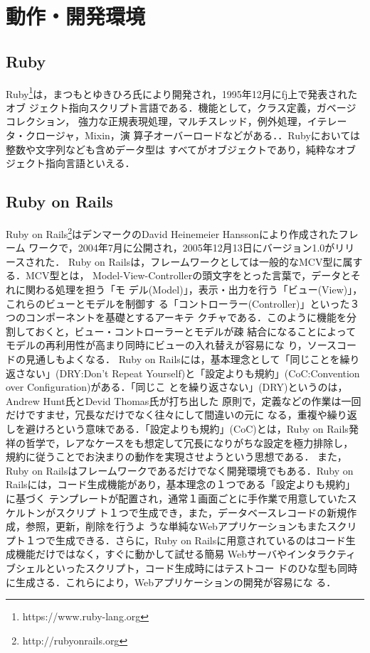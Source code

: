 \section{動作・開発環境}

\subsection{Ruby}
Ruby\footnote{https://www.ruby-lang.org}は，まつもとゆきひろ氏により開発され，1995年12月にfj上で発表されたオブ
ジェクト指向スクリプト言語である．機能として，クラス定義，ガベージコレクション，
強力な正規表現処理，マルチスレッド，例外処理，イテレータ・クロージャ，Mixin，演
算子オーバーロードなどがある．．Rubyにおいては整数や文字列なども含めデータ型は
すべてがオブジェクトであり，純粋なオブジェクト指向言語といえる．

\subsection{Ruby on Rails}
Ruby on Rails\footnote{http://rubyonrails.org}はデンマークのDavid Heinemeier Hanssonにより作成されたフレーム
ワークで，2004年7月に公開され，2005年12月13日にバージョン1.0がリリースされた．
Ruby on Railsは，フレームワークとしては一般的なMCV型に属する．MCV型とは，
Model-View-Controllerの頭文字をとった言葉で，データとそれに関わる処理を担う「モ
デル(Model)」，表示・出力を行う「ビュー(View)」，これらのビューとモデルを制御す
る「コントローラー(Controller)」といった３つのコンポーネントを基礎とするアーキテ
クチャである．このように機能を分割しておくと，ビュー・コントローラーとモデルが疎
結合になることによってモデルの再利用性が高まり同時にビューの入れ替えが容易にな
り，ソースコードの見通しもよくなる．
Ruby on Railsには，基本理念として「同じことを繰り返さない」(DRY:Don't Repeat
Yourself)と「設定よりも規約」(CoC:Convention over Configuration)がある．「同じこ
とを繰り返さない」(DRY)というのは，Andrew Hunt氏とDevid Thomas氏が打ち出した
原則で，定義などの作業は一回だけですませ，冗長なだけでなく往々にして間違いの元に
なる，重複や繰り返しを避けろという意味である．「設定よりも規約」(CoC)とは，Ruby
on Rails発祥の哲学で，レアなケースをも想定して冗長になりがちな設定を極力排除し，
規約に従うことでお決まりの動作を実現させようという思想である．
また，Ruby on Railsはフレームワークであるだけでなく開発環境でもある．Ruby on
Railsには，コード生成機能があり，基本理念の１つである「設定よりも規約」に基づく
テンプレートが配置され，通常１画面ごとに手作業で用意していたスケルトンがスクリプ
ト１つで生成でき，また，データベースレコードの新規作成，参照，更新，削除を行うよ
うな単純なWebアプリケーションもまたスクリプト１つで生成できる．さらに，Ruby on
Railsに用意されているのはコード生成機能だけではなく，すぐに動かして試せる簡易
Webサーバやインタラクティブシェルといったスクリプト，コード生成時にはテストコー
ドのひな型も同時に生成さる．これらにより，Webアプリケーションの開発が容易にな
る．

